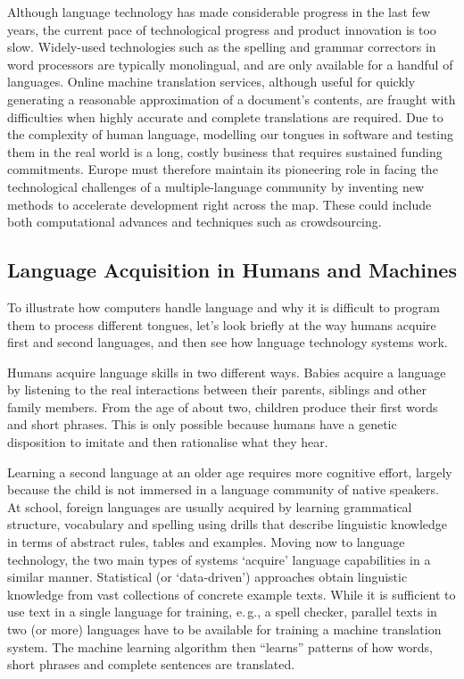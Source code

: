 \documentclass{../../metanetpaper}
\begin{document}
\begin{multicols}{2}
Although language technology has made considerable progress in the last few years, the current pace of technological progress and product innovation is too slow. Widely-used technologies such as the spelling and grammar correctors in word processors are typically monolingual, and are only available for a handful of languages. Online machine translation services, although useful for quickly generating a reasonable approximation of a document’s contents, are fraught with difficulties when highly accurate and complete translations are required. Due to the complexity of human language, modelling our tongues in software and testing them in the real world is a long, costly business that requires sustained funding commitments. Europe must therefore maintain its pioneering role in facing the technological challenges of a multiple-language community by inventing new methods to accelerate development right across the map. These could include both computational advances and techniques such as crowdsourcing.

\subsection{Language Acquisition in Humans and Machines}

To illustrate how computers handle language and why it is difficult to program them to process different tongues, let’s look briefly at the way humans acquire first and second languages, and then see how language technology systems work.

Humans acquire language skills in two different ways. Babies acquire a language by listening to the real interactions between their parents, siblings and other family members. From the age of about two, children produce their first words and short phrases. This is only possible because humans have a genetic disposition to imitate and then rationalise what they hear. 

Learning a second language at an older age requires more cognitive effort, largely because the child is not immersed in a language community of native speakers. At school, foreign languages are usually acquired by learning grammatical structure, vocabulary and spelling using drills that describe linguistic knowledge in terms of abstract rules, tables and examples.
Moving now to language technology, the two main types of systems ‘acquire’ language capabilities in a similar manner. Statistical (or ‘data-driven’) approaches obtain linguistic knowledge from vast collections of concrete example texts. While it is sufficient to use text in a single language for training, e.\,g., a spell checker, parallel texts in two (or more) languages have to be available for training a machine translation system. The machine learning algorithm then “learns” patterns of how words, short phrases and complete sentences are translated. 


\end{multicols}
\end{document}
